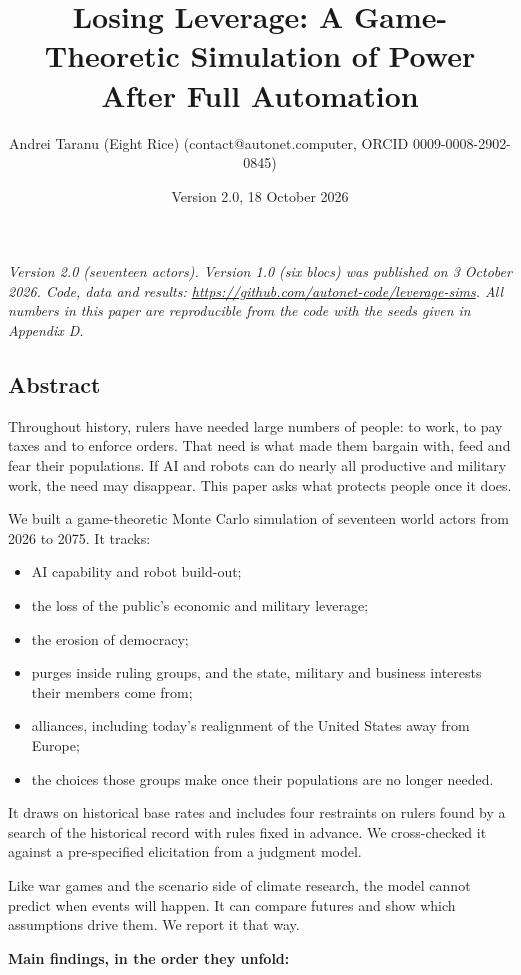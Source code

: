 \documentclass[
  10pt,
]{article}
\title{Losing Leverage: A Game-Theoretic Simulation of Power After Full Automation}
\author{Andrei Taranu (Eight Rice) (contact@autonet.computer, ORCID 0009-0008-2902-0845)}
\date{Version 2.0, 18 October 2026}
\providecommand{\tightlist}{%
  \setlength{\itemsep}{0pt}\setlength{\parskip}{0pt}}
\begin{document}
\maketitle

\emph{Version 2.0 (seventeen actors). Version 1.0 (six blocs) was published on 3 October 2026. Code,
data and results: \url{https://github.com/autonet-code/leverage-sims}. All numbers in this paper are
reproducible from the code with the seeds given in Appendix D.}

\subsection{Abstract}\label{abstract}

Throughout history, rulers have needed large numbers of people: to work, to pay taxes and to enforce
orders. That need is what made them bargain with, feed and fear their populations. If AI and robots
can do nearly all productive and military work, the need may disappear. This paper asks what
protects people once it does.

We built a game-theoretic Monte Carlo simulation of seventeen world actors from 2026 to 2075. It
tracks:

\begin{itemize}
\tightlist
\item
  AI capability and robot build-out;
\item
  the loss of the public's economic and military leverage;
\item
  the erosion of democracy;
\item
  purges inside ruling groups, and the state, military and business interests their members come
  from;
\item
  alliances, including today's realignment of the United States away from Europe;
\item
  the choices those groups make once their populations are no longer needed.
\end{itemize}

It draws on historical base rates and includes four restraints on rulers found by a search of the
historical record with rules fixed in advance. We cross-checked it against a pre-specified
elicitation from a judgment model.

Like war games and the scenario side of climate research, the model cannot predict when events will
happen. It can compare futures and show which assumptions drive them. We report it that way.

\textbf{Main findings, in the order they unfold:}
\end{document}
